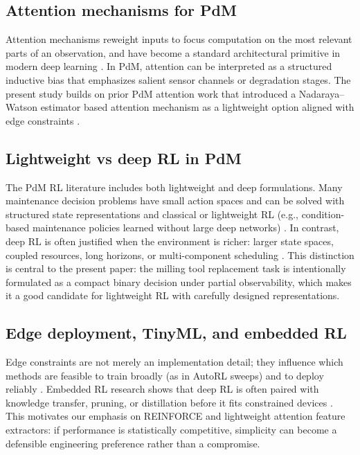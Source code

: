 \documentclass[11pt]{article}
\begin{document}
\subsection{Attention mechanisms for PdM}
Attention mechanisms reweight inputs to focus computation on the most relevant parts of an observation, and have become a standard architectural primitive in modern deep learning \parencite{Vaswani2017Attention}. In PdM, attention can be interpreted as a structured inductive bias that emphasizes salient sensor channels or degradation stages. The present study builds on prior PdM attention work that introduced a Nadaraya--Watson estimator based attention mechanism as a lightweight option aligned with edge constraints \parencite{Siraskar2024NWAttention}.

\subsection{Lightweight vs deep RL in PdM}
The PdM RL literature includes both lightweight and deep formulations. Many maintenance decision problems have small action spaces and can be solved with structured state representations and classical or lightweight RL (e.g., condition-based maintenance policies learned without large deep networks) \parencite{Adsule2020CBMRL, Yousefi2020QualityEngineering}. In contrast, deep RL is often justified when the environment is richer: larger state spaces, coupled resources, long horizons, or multi-component scheduling \parencite{Liu2020EJOR, LeeMitici2022RESS, Chen2023IISE, Ong2022TransferDRL}. This distinction is central to the present paper: the milling tool replacement task is intentionally formulated as a compact binary decision under partial observability, which makes it a good candidate for lightweight RL with carefully designed representations.

\subsection{Edge deployment, TinyML, and embedded RL}
Edge constraints are not merely an implementation detail; they influence which methods are feasible to train broadly (as in AutoRL sweeps) and to deploy reliably \parencite{Compare2020IoT, Njor2024TinyML, Pandey2023EdgeDNN}. Embedded RL research shows that deep RL is often paired with knowledge transfer, pruning, or distillation before it fits constrained devices \parencite{Jang2020KnowledgeTransfer, Szydlo2022TinyRL, Xu2022ISORC}. This motivates our emphasis on REINFORCE and lightweight attention feature extractors: if performance is statistically competitive, simplicity can become a defensible engineering preference rather than a compromise.
\end{document}
